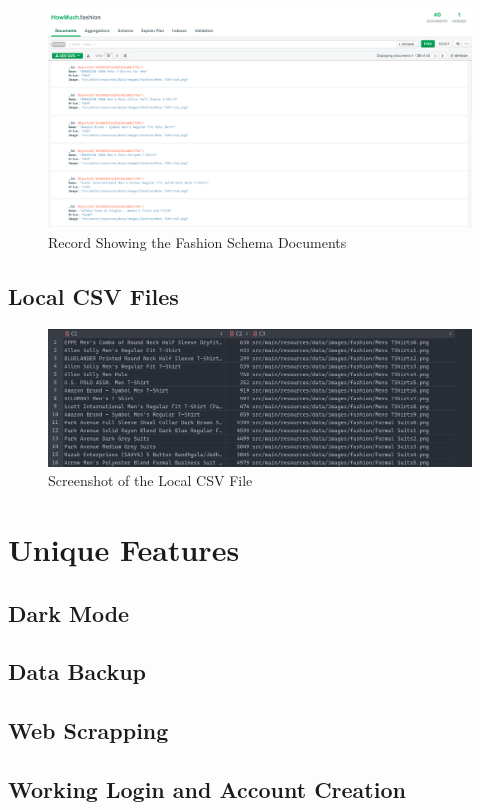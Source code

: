 \documentclass[11pt]{article}
\begin{document}
\begin{figure}[H]
	\centering
	\includegraphics[scale=0.4]{mongo 2.png}
	\caption{Record Showing the Fashion Schema Documents}
\end{figure}
\subsection{Local CSV Files}
\begin{figure}[H]
\centering
\includegraphics[scale=0.4]{csv.png}
\caption{Screenshot of the Local CSV File}
\end{figure}
\section{Unique Features}
\subsection{Dark Mode}
\subsection{Data Backup}
\subsection{Web Scrapping}
\subsection{Working Login and Account Creation}
\end{document}
